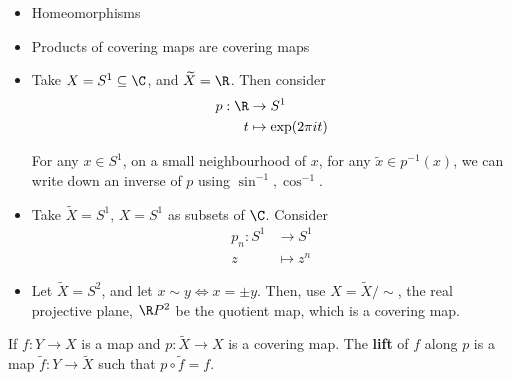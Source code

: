\documentclass{article}
\numberwithin{nthm}{subsection}
\begin{document}
\begin{eg}
    \leavevmode
    \begin{itemize}
        \item Homeomorphisms
        \item Products of covering maps are covering maps
        \item Take $X = S^1 \subseteq \C$, and $\widetilde{X} = \R$. Then consider
            \begin{align*}
                p: \R &\to S^1 \\ t &\mapsto \exp(2 \pi i t)
            \end{align*}

            For any $x \in S^1$, on a small neighbourhood of $x$, for any $\widetilde{x} \in p^{-1}(x)$, we can write down an inverse of $p$ using $\sin^{-1}, \cos^{-1}$.
        \item Take $\widetilde{X} = S^1,\, X = S^1$ as subsets of $\C$. Consider
            \begin{align*}
                p_n: S^1 &\to S^1 \\
                z &\mapsto z^n
            \end{align*}
        \item Let $\widetilde{X} = S^2$, and let $x \sim y \iff x = \pm y$. Then, use $X = \widetilde{X}/\sim$, the real projective plane, $\R P^2$ be the quotient map, which is a covering map.

            \begin{center}
            \end{center}
    \end{itemize}
\end{eg}

\begin{defi}
    If $f: Y \to X$ is a map and $p: \widetilde{X} \to X$ is a covering map. The \textbf{lift} of $f$ along $p$ is a map $\widetilde{f}: Y \to \widetilde{X}$ such that $p \circ \widetilde{f} = f$.
\end{defi}
\end{document}
